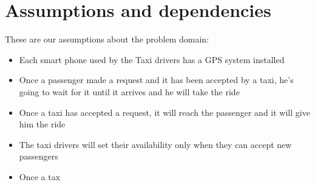 \section{Assumptions and dependencies}
These are our assumptions about the problem domain:
\begin{itemize}
\item Each smart phone used by the Taxi drivers has a GPS system installed
\item Once a passenger made a request and it has been accepted by a taxi, he's going to wait for it until it arrives and he will take the ride
\item Once a taxi has accepted a request, it will reach the passenger and it will give him the ride
\item The taxi drivers will set their availability only when they can accept new passengers
\item Once a tax
\end{itemize}